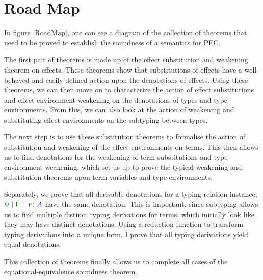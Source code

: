 \documentclass{Report}
\begin{document}
\section{Road Map}
In figure \ref{RoadMap}, one can see a diagram of the collection of theorems that need to be proved to establish the soundness of a semantics for PEC.


The first pair of theorems is made up of the effect substitution and weakening theorem on effects. These theorems show that substitutions of effects have a well-behaved and easily defined action upon the denotations of effects. Using these theorems, we can then move on to characterize the action of effect substitutions and effect-environment weakening on the denotations of types and type environments. From this, we can also look at the action of weakening and substituting effect environments on the subtyping between types.

The next step is to use these substitution theorems to formalise the action of substitution and weakening of the effect environments on terms. This then allows us to find denotations for the weakening of term substitutions and type environment weakening, which set us up to prove the typical weakening and substitution theorems upon term variables and type environments. 

Separately, we prove that all derivable denotations for a typing relation instance, $\gpetyperelation{v}{A}$ have the same denotation. This is important, since subtyping allows us to find multiple distinct typing derivations for terms, which initially look like they may have distinct denotations. Using a reduction function to transform typing derivations into a unique form, I prove that all typing derivations yield equal denotations.

This collection of theorems finally allows us to complete all cases of the equational-equivalence soundness theorem.
\end{document}
